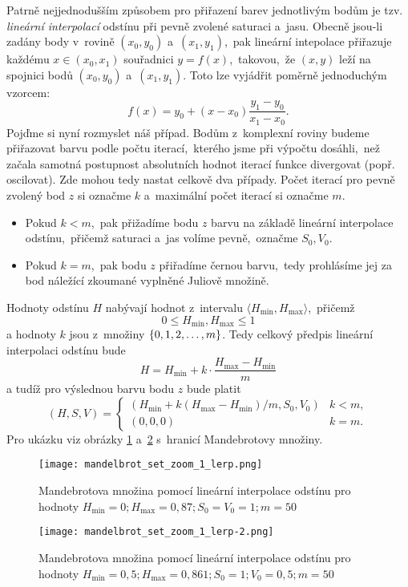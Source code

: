 Patrně nejjednodušším způsobem pro přiřazení barev jednotlivým bodům je tzv. \emph{lineární interpolací} odstínu při pevně zvolené saturaci a~jasu. Obecně jsou-li zadány body v~rovině $(x_0,y_0)$ a~$(x_1,y_1)$,~pak lineární intepolace přiřazuje každému $x\in(x_0,x_1)$ souřadnici $y=f(x)$,~takovou,~že $(x,y)$ leží na spojnici bodů $(x_0,y_0)$ a~$(x_1,y_1)$. Toto lze vyjádřit poměrně jednoduchým vzorcem:
\[f(x)=y_{0}+(x-x_{0}){\frac {y_{1}-y_{0}}{x_{1}-x_{0}}}.\]
Pojďme si nyní rozmyslet náš případ. Bodům z~komplexní roviny budeme přiřazovat barvu podle počtu iterací,~kterého jsme při výpočtu dosáhli,~než začala samotná postupnost absolutních hodnot iterací funkce divergovat (popř. oscilovat). Zde mohou tedy nastat celkově dva případy. Počet iterací pro pevně zvolený bod $z$ si označme $k$ a~maximální počet iterací si označme $m$.
\begin{itemize}
    \item Pokud $k<m$,~pak přižadíme bodu $z$ barvu na základě lineární interpolace odstínu,~přičemž saturaci a~jas volíme pevně,~označme $S_0,V_0$.
    \item Pokud $k=m$,~pak bodu $z$ přiřadíme černou barvu,~tedy prohlásíme jej za bod náležící zkoumané vyplněné Juliově množině.
\end{itemize}

Hodnoty odstínu $H$ nabývají hodnot z~intervalu $\langle H_{\text{min}},H_{\text{max}}\rangle$,~přičemž
\[0\leqslant H_{\text{min}},H_{\text{max}}\leqslant 1\]
a hodnoty $k$ jsou z~množiny $\left\{0,1,2,\ldots,m\right\}$. Tedy celkový předpis lineární interpolaci odstínu bude
\[H=H_{\text{min}}+k\cdot\frac{H_{\text{max}}-H_{\text{min}}}{m}\]
a tudíž pro výslednou barvu bodu $z$ bude platit 
\[(H,S,V)=\begin{cases}
    \left(H_{\text{min}}+k(H_{\text{max}}-H_{\text{min}})/m,S_0,V_0\right) & k<m,\\
    (0,0,0) & k=m.
\end{cases}\]
Pro ukázku viz obrázky \ref{fig:mandelbrotova-mnozina-lerp-1} a~\ref{fig:mandelbrotova-mnozina-lerp-2} s~hranicí Mandebrotovy množiny.
\begin{figure}[h]
    \centering
    \texttt{[image: mandelbrot\_set\_zoom\_1\_lerp.png]}
    \caption{Mandebrotova množina pomocí lineární interpolace odstínu pro hodnoty $H_{\text{min}}=0;H_{\text{max}}=0{,}87;S_0=V_0=1;m=50$}
    \label{fig:mandelbrotova-mnozina-lerp-1}
\end{figure}
\begin{figure}[h]
    \centering
    \texttt{[image: mandelbrot\_set\_zoom\_1\_lerp-2.png]}
    \caption{Mandebrotova množina pomocí lineární interpolace odstínu pro hodnoty $H_{\text{min}}=0{,}5;H_{\text{max}}=0{,}861;S_0=1;V_0=0{,}5;m=50$}
    \label{fig:mandelbrotova-mnozina-lerp-2}
\end{figure}


